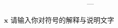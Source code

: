 \clearpage


\titlespacing{\chapter}{0pt}{0mm}{5mm}



\begin{labeling}{~~~~~~~~~~~~~~~~~~~~~~~~---}
\item [$\boldsymbol{x}$] 请输入你对符号的解释与说明文字

\end{labeling}
\titlespacing{\chapter}{0pt}{-6mm}{5mm}
\clearpage{\pagestyle{empty}\cleardoublepage}
